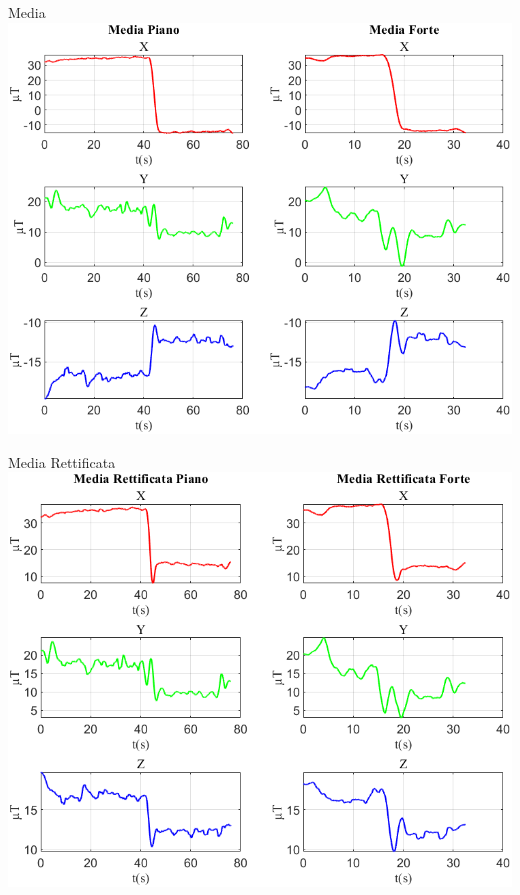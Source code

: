 	\begin{frame}{{Media}}
		\centering\includegraphics[height=.8\textheight]{figure/Mag/Media}
	\end{frame}
	
	\begin{frame}{{Media Rettificata}}
		\centering\includegraphics[height=.8\textheight]{figure/Mag/Media Rettificata}
	\end{frame}
	
